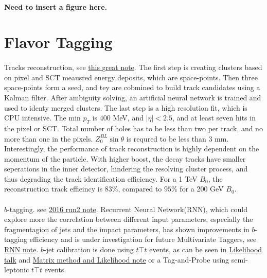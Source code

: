 \paragraph{Need to insert a figure here.}

\section{Flavor Tagging}
\paragraph{}
Tracks reconstruction, see \href{https://cds.cern.ch/record/2254947/files/PERF-2015-08-002.pdf}{this great note}. The first step is creating clusters based on pixel and SCT meausred energy deposits, which are space-points. Then three space-points form a seed, and tey are cobmined to build track candidates using a Kalman filter. After ambiguity solving, an artificial neural network is trained and used to identy merged clusters. The last step is a high resolution fit, which is CPU intensive. The min $p_T$ is 400 MeV, and $|\eta| < 2.5$, and at least seven hits in the pixel or SCT. Total number of holes has to be less than two per track, and no more than one in the pixels. $Z_{0}^{BL} \sin{\theta}$ is requred to be less than 3 mm. Interestingly, the performance of track reconstruction is highly dependent on the momentum of the particle. With higher boost, the decay tracks have smaller seperations in the inner detector, hindering the resolving cluster process, and thus degrading the track identification efficiency. For a 1 TeV $B_{0}$, the reconstruction track effieincy is $83\%$, compared to $95\%$ for a 200 GeV $B_{0}$.

\paragraph{}
$b$-tagging. see \href{https://cds.cern.ch/record/2160731/files/ATL-PHYS-PUB-2016-012.pdf}{2016 run2 note}. Recurrent Neural Network(RNN), which could explore more the correlation between different input parameters, especially the fragmentagion of jets and the impact parameters, has shown improvements in $b$-tagging efficiency and is under investigation for future Multivariate Taggers, see \href{https://cds.cern.ch/record/2253371}{RNN note}. $b$-jet calibration is done using $t\top{t}$ events, as can be seen in \href{https://indico.cern.ch/event/622490/contributions/2510894/attachments/1425202/2191220/ttbar_PDF_Calibration_MVA_Training_Approval_140317.pdf}{Likelihood talk} and \href{https://cds.cern.ch/record/1538335/files/ATL-COM-PHYS-2013-395.pdf}{Matrix method and Likelihood note} or a Tag-and-Probe using semi-leptonic $t\top{t}$ events.


